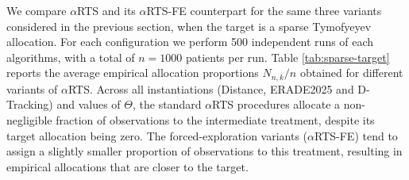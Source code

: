 We compare \(\alpha\)RTS and its \(\alpha\)RTS-FE counterpart for the same three variants considered in the previous section, when the target is a sparse Tymofyeyev allocation.
For each configuration we perform 500 independent runs of each algorithms, with a total of \(n=1000\) patients per run. Table \ref{tab:sparse-target} reports the average empirical allocation proportions $N_{n,k}/n$ obtained for different variants of $\alpha$RTS.
Across all instantiations (Distance, ERADE2025 and D-Tracking) and values of $\Theta$, the standard \(\alpha\)RTS procedures allocate a non-negligible fraction of observations to the intermediate treatment, despite its target allocation being zero. The forced-exploration variants (\(\alpha\)RTS-FE) tend to assign a slightly smaller proportion of observations to this treatment, resulting in empirical allocations that are closer to the target. %
	
	





%

